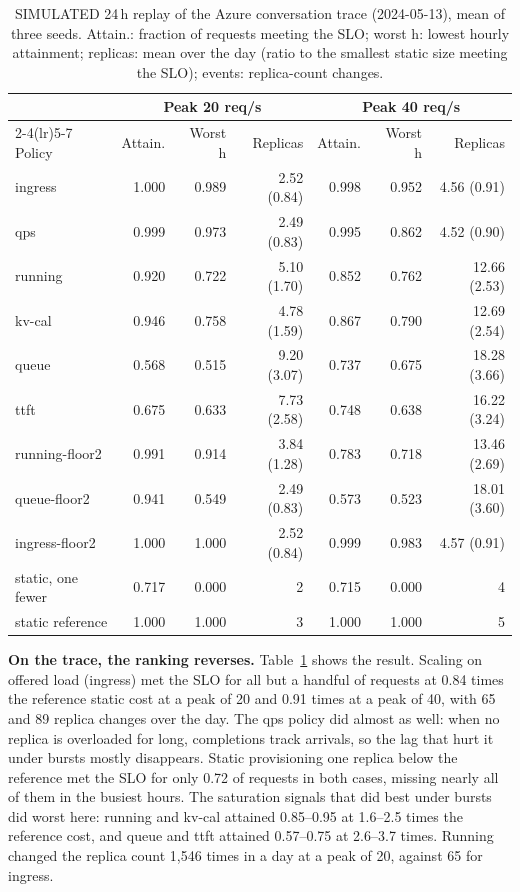 \documentclass[10pt,conference]{IEEEtran}
\begin{document}
\begin{table}[t]
\centering
\caption{SIMULATED 24\,h replay of the Azure conversation trace (2024-05-13),
mean of three seeds. Attain.: fraction of requests meeting the SLO; worst h:
lowest hourly attainment; replicas: mean over the day (ratio to the smallest
static size meeting the SLO); events: replica-count changes.}
\label{tab:trace}
\small
\begin{tabular}{lrrrrrr}
\toprule
& \multicolumn{3}{c}{Peak 20 req/s} & \multicolumn{3}{c}{Peak 40 req/s} \\
\cmidrule(lr){2-4}\cmidrule(lr){5-7}
Policy & Attain. & Worst h & Replicas & Attain. & Worst h & Replicas \\
\midrule
ingress        & 1.000 & 0.989 & 2.52 (0.84) & 0.998 & 0.952 & 4.56 (0.91) \\
qps            & 0.999 & 0.973 & 2.49 (0.83) & 0.995 & 0.862 & 4.52 (0.90) \\
running        & 0.920 & 0.722 & 5.10 (1.70) & 0.852 & 0.762 & 12.66 (2.53) \\
kv-cal         & 0.946 & 0.758 & 4.78 (1.59) & 0.867 & 0.790 & 12.69 (2.54) \\
queue          & 0.568 & 0.515 & 9.20 (3.07) & 0.737 & 0.675 & 18.28 (3.66) \\
ttft           & 0.675 & 0.633 & 7.73 (2.58) & 0.748 & 0.638 & 16.22 (3.24) \\
running-floor2 & 0.991 & 0.914 & 3.84 (1.28) & 0.783 & 0.718 & 13.46 (2.69) \\
queue-floor2   & 0.941 & 0.549 & 2.49 (0.83) & 0.573 & 0.523 & 18.01 (3.60) \\
ingress-floor2 & 1.000 & 1.000 & 2.52 (0.84) & 0.999 & 0.983 & 4.57 (0.91) \\
\midrule
static, one fewer & 0.717 & 0.000 & 2 & 0.715 & 0.000 & 4 \\
static reference  & 1.000 & 1.000 & 3 & 1.000 & 1.000 & 5 \\
\bottomrule
\end{tabular}
\end{table}

\textbf{On the trace, the ranking reverses.} Table~\ref{tab:trace} shows the
result. Scaling on offered load (ingress) met the SLO for all but a handful of
requests at 0.84 times the reference static cost at a peak of 20 and 0.91
times at a peak of 40, with 65 and 89 replica changes over the day. The qps
policy did almost as well: when no replica is overloaded for long,
completions track arrivals, so the lag that hurt it under bursts mostly
disappears. Static provisioning one replica below the reference met the SLO
for only 0.72 of requests in both cases, missing nearly all of them in the
busiest hours. The saturation signals that did best under bursts did worst
here: running and kv-cal attained 0.85--0.95 at 1.6--2.5 times the reference
cost, and queue and ttft attained 0.57--0.75 at 2.6--3.7 times. Running
changed the replica count 1{,}546 times in a day at a peak of 20, against 65
for ingress.
\end{document}
